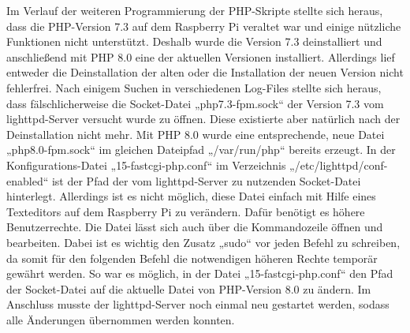 Im Verlauf der weiteren Programmierung der PHP-Skripte stellte sich heraus, dass die PHP-Version 7.3 auf dem Raspberry Pi veraltet war und einige nützliche Funktionen nicht unterstützt. Deshalb wurde die Version 7.3 deinstalliert und anschließend mit PHP 8.0 eine der aktuellen Versionen installiert. Allerdings lief entweder die Deinstallation der alten oder die Installation der neuen Version nicht fehlerfrei. Nach einigem Suchen in verschiedenen Log-Files stellte sich heraus, dass fälschlicherweise die Socket-Datei „php7.3-fpm.sock“ der Version 7.3 vom lighttpd-Server versucht wurde zu öffnen. Diese existierte aber natürlich nach der Deinstallation nicht mehr. Mit PHP 8.0 wurde eine entsprechende, neue Datei „php8.0-fpm.sock“ im gleichen Dateipfad „/var/run/php“ bereits erzeugt. In der Konfigurations-Datei „15-fastcgi-php.conf“ im Verzeichnis „/etc/lighttpd/conf-enabled“ ist der Pfad der vom lighttpd-Server zu nutzenden Socket-Datei hinterlegt. Allerdings ist es nicht möglich, diese Datei einfach mit Hilfe eines Texteditors auf dem Raspberry Pi zu verändern. Dafür benötigt es höhere Benutzerrechte. Die Datei lässt sich auch über die Kommandozeile öffnen und bearbeiten. Dabei ist es wichtig den Zusatz „sudo“ vor jeden Befehl zu schreiben, da somit für den folgenden Befehl die notwendigen höheren Rechte temporär gewährt werden. So war es möglich, in der Datei „15-fastcgi-php.conf“ den Pfad der Socket-Datei auf die aktuelle Datei von PHP-Version 8.0 zu ändern. Im Anschluss musste der lighttpd-Server noch einmal neu gestartet werden, sodass alle Änderungen übernommen werden konnten.

